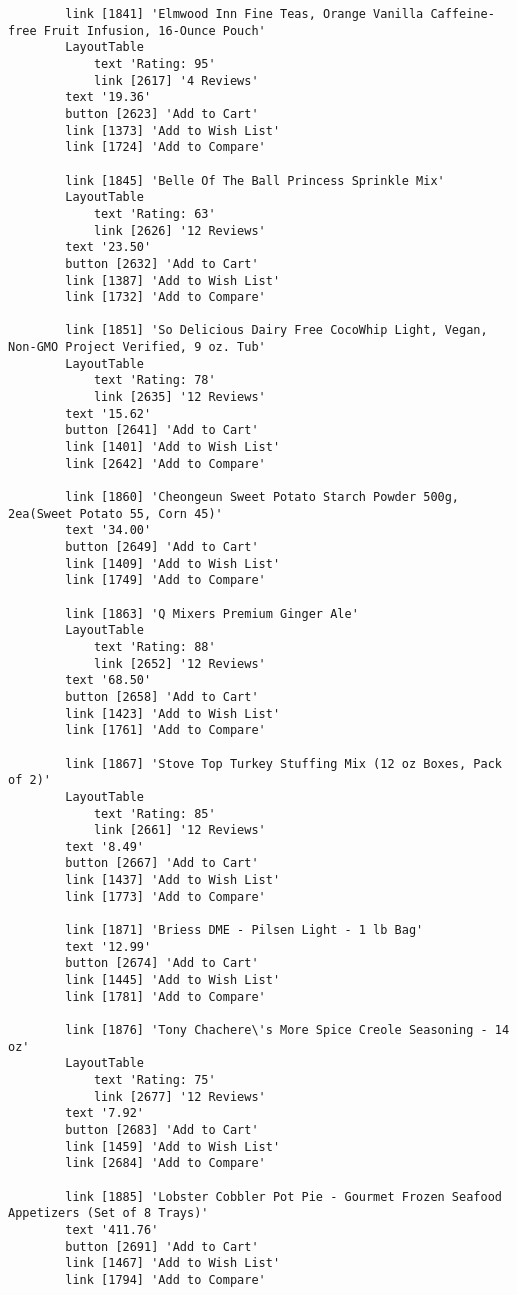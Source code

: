 \begin{tcolorbox}[breakable]
\begin{lstlisting}
        link [1841] 'Elmwood Inn Fine Teas, Orange Vanilla Caffeine-free Fruit Infusion, 16-Ounce Pouch'
        LayoutTable
            text 'Rating: 95'
            link [2617] '4 Reviews'
        text '19.36'
        button [2623] 'Add to Cart'
        link [1373] 'Add to Wish List'
        link [1724] 'Add to Compare'

        link [1845] 'Belle Of The Ball Princess Sprinkle Mix'
        LayoutTable
            text 'Rating: 63'
            link [2626] '12 Reviews'
        text '23.50'
        button [2632] 'Add to Cart'
        link [1387] 'Add to Wish List'
        link [1732] 'Add to Compare'

        link [1851] 'So Delicious Dairy Free CocoWhip Light, Vegan, Non-GMO Project Verified, 9 oz. Tub'
        LayoutTable
            text 'Rating: 78'
            link [2635] '12 Reviews'
        text '15.62'
        button [2641] 'Add to Cart'
        link [1401] 'Add to Wish List'
        link [2642] 'Add to Compare'

        link [1860] 'Cheongeun Sweet Potato Starch Powder 500g, 2ea(Sweet Potato 55, Corn 45)'
        text '34.00'
        button [2649] 'Add to Cart'
        link [1409] 'Add to Wish List'
        link [1749] 'Add to Compare'

        link [1863] 'Q Mixers Premium Ginger Ale'
        LayoutTable
            text 'Rating: 88'
            link [2652] '12 Reviews'
        text '68.50'
        button [2658] 'Add to Cart'
        link [1423] 'Add to Wish List'
        link [1761] 'Add to Compare'

        link [1867] 'Stove Top Turkey Stuffing Mix (12 oz Boxes, Pack of 2)'
        LayoutTable
            text 'Rating: 85'
            link [2661] '12 Reviews'
        text '8.49'
        button [2667] 'Add to Cart'
        link [1437] 'Add to Wish List'
        link [1773] 'Add to Compare'

        link [1871] 'Briess DME - Pilsen Light - 1 lb Bag'
        text '12.99'
        button [2674] 'Add to Cart'
        link [1445] 'Add to Wish List'
        link [1781] 'Add to Compare'

        link [1876] 'Tony Chachere\'s More Spice Creole Seasoning - 14 oz'
        LayoutTable
            text 'Rating: 75'
            link [2677] '12 Reviews'
        text '7.92'
        button [2683] 'Add to Cart'
        link [1459] 'Add to Wish List'
        link [2684] 'Add to Compare'

        link [1885] 'Lobster Cobbler Pot Pie - Gourmet Frozen Seafood Appetizers (Set of 8 Trays)'
        text '411.76'
        button [2691] 'Add to Cart'
        link [1467] 'Add to Wish List'
        link [1794] 'Add to Compare'


\end{lstlisting}
\end{tcolorbox}
